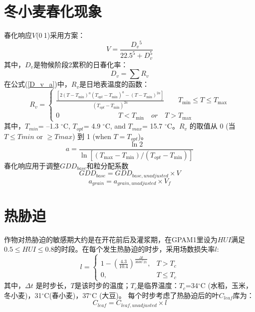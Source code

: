 \section{冬小麦春化现象}
春化响应$V$(0$~$1)采用\citet{streck2003incorporating}方案：
\begin{equation}
V=\frac{D_{v}{ }^{5}}{22.5^{5}+D_{v}^{5}}
\end{equation}
其中，$D_v$是物候阶段2累积的日春化率：
\begin{equation}\label{D_v_a}
D_{v}=\sum R_{v}
\end{equation}
在公式(\ref{D_v_a})中，$R_{v}$是日地表温度的函数：
\begin{equation}
R_{v}=\left\{\begin{array}{c}\frac{\left[2\left(T-T_{\min }\right)^{a}\left(T_{{opt}}-T_{\min }\right)^{a}-\left(T-T_{\min }\right)^{2 a}\right]}{\left(T_{{opt}}-T_{\min }\right)^{2 a}} \ \ \ \ \ \ \ \ \    T_{\min } \leq T \leq T_{\max }\\
 0   \ \ \  \ \ \ \ \ \ \ \ \ \    \ \ \ \ \   \ \ \ \ \ \ \ \ \ \ \ \ \ \ \  \ \ \ \ \    T<T_{\min } \quad  { or } \quad T>T_{\max }
\end{array}\right.
\end{equation}
其中，$T_{min}$= –1.3 $^{\circ}$C, $T_{opt}$= 4.9 $^{\circ}$C, and $T_{max}$= 15.7 $^{\circ}$C。$ R_v$ 的取值从 0 (当$ T\leq Tmin$ or $ \geq  Tmax$) 到 1 (when $T=T_{opt}$)。
\begin{equation}
a=\frac{\ln 2}{\ln \left[\left(T_{\max }-T_{\min }\right) /\left(T_{o p t}-T_{\min }\right)\right]}
\end{equation}
春化响应用于调整$GDD_{base}$和粒分配系数
\begin{equation}
G D D_{b a s e}=G D D_{b a s e,  { unadjusted }} \times V
\end{equation}
\begin{equation}
a_{ {grain }}=a_{ {grain,unadjusted }} \times V_{f}
\end{equation}
\section{热胁迫}
作物对热胁迫的敏感期大约是在开花前后及灌浆期，在GPAM1里设为$HUI $满足$0.5 \leq HUI \leq 0.8$的时段。在每个发生热胁迫的时步，采用场数损失率$l$:
\begin{equation}
l=\left\{\begin{array}{cc}1-\left(\frac{4.3}{10.4}\right)^{\frac{\Delta t}{3600^{*} 21}}, & T>T_{c} \\ 0, & T \leq T_{c}\end{array}\right.
\end{equation}
其中，$\Delta t$ 是时步长，$T$是该时步的温度；$T_c$是临界温度：$T_c$=34$^{\circ}$C (水稻，玉米，冬小麦)，31$^{\circ}$C(春小麦)，37$^{\circ}$C (大豆)。
每个时步考虑了热胁迫后的叶$C_{leaf}$库为：
\begin{equation}
C_{leaf}=C_{leaf,  {unadjusted}} \times l
\end{equation}
